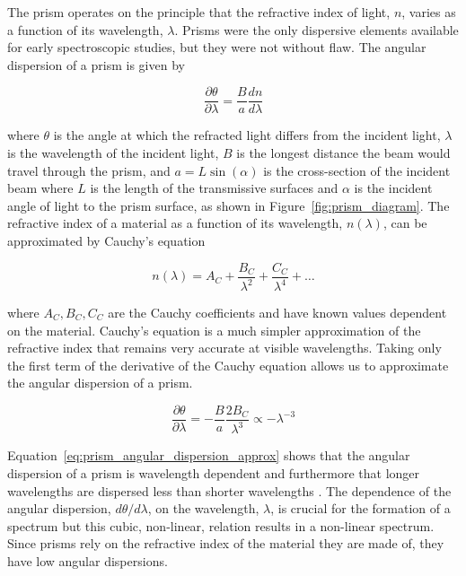 The prism operates on the principle that the refractive index of light, $n$, varies as a function of its wavelength, $\lambda$. Prisms were the only dispersive elements available for early spectroscopic studies, but they were not without flaw. The angular dispersion of a prism is given by

\begin{equation}
    \frac{\partial \theta}{\partial \lambda} = \frac{B}{a}\frac{dn}{d\lambda}%
    \label{eq:prism_angular_dispersion}
\end{equation}

\noindent where $\theta$ is the angle at which the refracted light differs from the incident light, $\lambda$ is the wavelength of the incident light, $B$ is the longest distance the beam would travel through the prism, and $a = L \sin(\alpha)$ is the cross-section of the incident beam where $L$ is the length of the transmissive surfaces and $\alpha$ is the incident angle of light to the prism surface, as shown in Figure~\ref{fig:prism_diagram}. The refractive index of a material as a function of its wavelength, $n(\lambda)$, can be approximated by Cauchy's equation

\begin{equation}
    n(\lambda) = A_{C} + \frac{B_{C}}{\lambda^{2}} + \frac{C_{C}}{\lambda^{4}} + \dots
    \label{eq:Cauchy}
\end{equation}

\noindent where $A_{C}, B_{C}, C_{C}$ are the Cauchy coefficients and have known values dependent on the material. Cauchy's equation is a much simpler approximation of the refractive index that remains very accurate at visible wavelengths. Taking only the first term of the derivative of the Cauchy equation allows us to approximate the angular dispersion of a prism.

\begin{equation}
    \frac{\partial \theta}{\partial \lambda} = -\frac{B}{a}\frac{2B_{C}}{\lambda^{3}} \propto -\lambda^{-3}
    \label{eq:prism_angular_dispersion_approx}
\end{equation}

Equation~\ref{eq:prism_angular_dispersion_approx} shows that the angular dispersion of a prism is wavelength dependent and furthermore that longer wavelengths are dispersed less than shorter wavelengths \citep{BirneyObsAstro, Hecht_optics}. The dependence of the angular dispersion, $d\theta/d\lambda$, on the wavelength, $\lambda$, is crucial for the formation of a spectrum but this cubic, non-linear, relation results in a non-linear spectrum. Since prisms rely on the refractive index of the material they are made of, they have low angular dispersions.
\prgph


